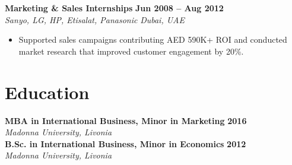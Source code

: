 \documentclass[10.5pt,a4paper]{article}
\begin{document}
\noindent\textbf{Marketing \& Sales Internships} \hfill \textbf{Jun 2008 -- Aug 2012}\\
\textit{Sanyo, LG, HP, Etisalat, Panasonic} \hfill \textit{Dubai, UAE}
\begin{itemize}[leftmargin=*,nosep,topsep=2pt]
  \item Supported sales campaigns contributing AED 590K+ ROI and conducted market research that improved customer engagement by 20\%.
\end{itemize}

\section{Education}
\noindent\textbf{MBA in International Business, Minor in Marketing} \hfill \textbf{2016}\\
\textit{Madonna University, Livonia}\\
\vspace{2pt}
\noindent\textbf{B.Sc. in International Business, Minor in Economics} \hfill \textbf{2012}\\
\textit{Madonna University, Livonia}
\end{document}
